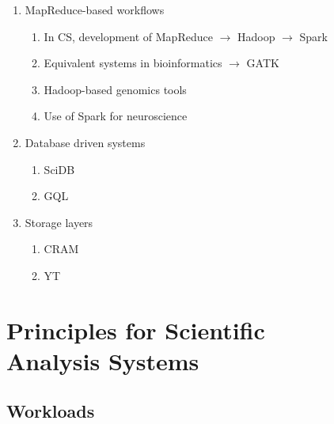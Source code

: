 \documentclass{acm_proc_article-sp}
\begin{document}
\begin{enumerate}
\item MapReduce-based workflows
\begin{enumerate}
\item In CS, development of MapReduce $\rightarrow$ Hadoop $\rightarrow$ Spark
\item Equivalent systems in bioinformatics $\rightarrow$ GATK \cite{mckenna10}
\item Hadoop-based genomics tools \cite{schatz09, langmead09}
\item Use of Spark for neuroscience
\end{enumerate}
\item Database driven systems
\begin{enumerate}
\item SciDB \cite{brown10}
\item GQL \cite{kozanitis14, bafna13}
\end{enumerate}
\item Storage layers
\begin{enumerate}
\item CRAM \cite{fritz11}
\item YT \cite{turk11}
\end{enumerate}
\end{enumerate}

\section{Principles for Scientific \\ Analysis Systems}
\label{sec:principles}

\subsection{Workloads}
\label{sec:workloads}
\end{document}
